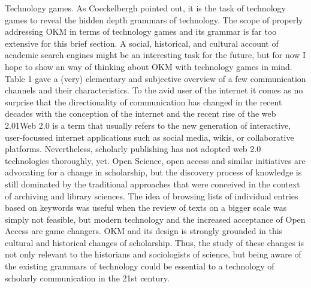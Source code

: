 Technology games. As Coeckelbergh pointed out, it is the task of
technology games to reveal the hidden depth grammars of technology. The
scope of properly addressing OKM in terms of technology games and its
grammar is far too extensive for this brief section. A social,
historical, and cultural account of academic search engines might be an
interesting task for the future, but for now I hope to show an way of
thinking about OKM with technology games in mind. Table 1 gave a (very)
elementary and subjective overview of a few communication channels and
their characteristics. To the avid user of the internet it comes as no
surprise that the directionality of communication has changed in the
recent decades with the conception of the internet and the recent rise
of the web 2.01Web 2.0 is a term that usually refers to the new
generation of interactive, user-focussed internet applications such as
social media, wikis, or collaborative platforms. Nevertheless,
scholarly publishing has not adopted web 2.0 technologies thoroughly,
yet. Open Science, open access and similar initiatives are advocating
for a change in scholarship, but the discovery process of knowledge is
still dominated by the traditional approaches that were conceived in the
context of archiving and library sciences. The idea of browsing lists of
individual entries based on keywords was useful when the review of texts
on a bigger scale was simply not feasible, but modern technology and the
increased acceptance of Open Access are game changers. OKM and its
design is strongly grounded in this cultural and historical changes of
scholarship. Thus, the study of these changes is not only relevant to
the historians and sociologists of science, but being aware of the
existing grammars of technology could be essential to a technology of
scholarly communication in the 21st century.